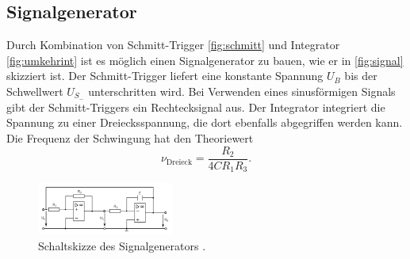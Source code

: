 \subsection{Signalgenerator}
Durch Kombination von Schmitt-Trigger \autoref{fig:schmitt} und Integrator \autoref{fig:umkehrint}
ist es möglich einen Signalgenerator zu bauen, wie er in \autoref{fig:signal} skizziert ist.
Der Schmitt-Trigger liefert eine konstante Spannung $U_B$ bis der Schwellwert $U_{S_{-}}$
unterschritten wird. Bei Verwenden eines sinusförmigen Signals gibt der Schmitt-Triggers
ein Rechtecksignal aus. Der Integrator integriert die Spannung zu einer Dreiecksspannung, die dort 
ebenfalls abgegriffen werden kann. Die Frequenz der Schwingung hat den Theoriewert
\begin{equation*}
    \nu_{\text{Dreieck}} = \frac{R_2}{4 C R_1 R_3}.
\end{equation*}
\begin{figure}[H]
    \centering
    \includegraphics[width=0.4\textwidth]{signalgenerator.png}
    \caption{Schaltskizze des Signalgenerators \cite{anleitung}.}
    \label{fig:signal}
\end{figure}

